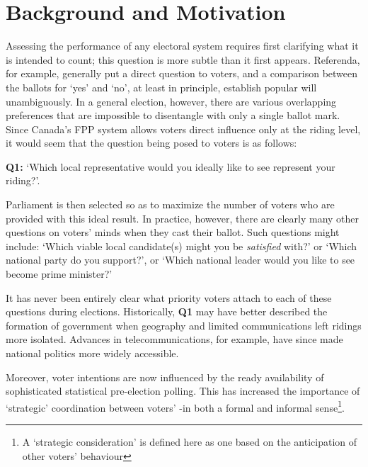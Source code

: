\documentclass[DIV=calc, paper=a4, fontsize=11pt, twocolumn]{scrartcl}	 %
\begin{document}
\section{Background and Motivation}
\label{sec:BM} 

Assessing the performance of any electoral system requires first clarifying what it is intended to count; this question is more subtle than it first appears. 
Referenda, for example, generally put a direct question to voters, and a comparison between the ballots for `yes' and `no', at least in principle, establish popular will unambiguously. 
In a general election, however, there are various overlapping preferences that are impossible to disentangle with only a single ballot mark.
Since Canada's FPP system allows voters direct influence only at the riding level, it would seem that the question being posed to voters is as follows:

\begin{tcolorbox}[colback=white!5!white,colframe=blue!55!black]
{\textbf{Q1:} } `Which local representative would you ideally like to see represent your riding?'. 
\end{tcolorbox}

Parliament is then selected so as to maximize the number of voters who are provided with this ideal result. 
In practice, however, there are clearly many other questions on voters' minds when they cast their ballot. 
Such questions might include: `Which viable local candidate(s) might you be \emph{satisfied} with?'  or `Which national party do you support?', or `Which national leader would you like to see become prime minister?' 

It has never been entirely clear what priority voters attach to each of these questions during elections. Historically, \textbf{Q1} may have better described the formation of government when geography and limited communications left ridings more isolated.
Advances in telecommunications, for example, have since made national politics more widely accessible. 

Moreover, voter intentions are now influenced by the ready availability of sophisticated statistical pre-election polling. This has increased the importance of `strategic' coordination  between voters' \--in both a formal\cite{Leadnow_environics} and informal sense\footnote{A `strategic  consideration' is defined here as one based on the anticipation of other voters' behaviour}. 
\end{document}
